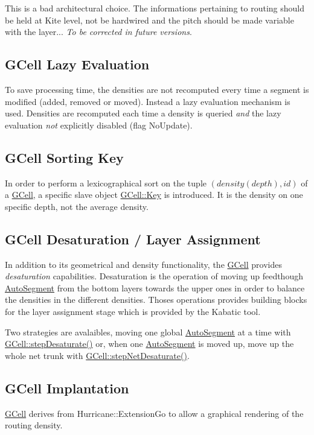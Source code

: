 This is a bad architectural choice. The informations pertaining to routing should be held at Kite level, not be hardwired and the pitch should be made variable with the layer... {\itshape To be corrected in future versions}.\hypertarget{classKatabatic_1_1GCell_secGCellLazyEvaluation}{}\subsection{G\+Cell Lazy Evaluation}\label{classKatabatic_1_1GCell_secGCellLazyEvaluation}
To save processing time, the densities are not recomputed every time a segment is modified (added, removed or moved). Instead a lazy evaluation mechanism is used. Densities are recomputed each time a density is queried {\itshape and} the lazy evaluation {\itshape not} explicitly disabled (flag No\+Update).\hypertarget{classKatabatic_1_1GCell_secGCellSortingKey}{}\subsection{G\+Cell Sorting Key}\label{classKatabatic_1_1GCell_secGCellSortingKey}
In order to perform a lexicographical sort on the tuple $(density(depth),id)$ of a \mbox{\hyperlink{classKatabatic_1_1GCell}{G\+Cell}}, a specific slave object \mbox{\hyperlink{classKatabatic_1_1GCell_1_1Key}{G\+Cell\+::\+Key}} is introduced. It is the density on one specific depth, not the average density.\hypertarget{classKatabatic_1_1GCell_secGCellDesaturation}{}\subsection{G\+Cell Desaturation / Layer Assignment}\label{classKatabatic_1_1GCell_secGCellDesaturation}
In addition to it\textquotesingle{}s geometrical and density functionality, the \mbox{\hyperlink{classKatabatic_1_1GCell}{G\+Cell}} provides {\itshape desaturation} capabilities. Desaturation is the operation of moving up feedthough \mbox{\hyperlink{classKatabatic_1_1AutoSegment}{Auto\+Segment}} from the bottom layers towards the upper ones in order to balance the densities in the different densities. Thoses operations provides building blocks for the layer assignment stage which is provided by the Kabatic tool.

Two strategies are avalaibles, moving one global \mbox{\hyperlink{classKatabatic_1_1AutoSegment}{Auto\+Segment}} at a time with \mbox{\hyperlink{classKatabatic_1_1GCell_a5ae4d250ebecf59aa98fb068d848be14}{G\+Cell\+::step\+Desaturate()}} or, when one \mbox{\hyperlink{classKatabatic_1_1AutoSegment}{Auto\+Segment}} is moved up, move up the whole net trunk with \mbox{\hyperlink{classKatabatic_1_1GCell_abe4cf4a81bb78e9b479992336a999a07}{G\+Cell\+::step\+Net\+Desaturate()}}.\hypertarget{classKatabatic_1_1GCell_secGCellImplantation}{}\subsection{G\+Cell Implantation}\label{classKatabatic_1_1GCell_secGCellImplantation}
\mbox{\hyperlink{classKatabatic_1_1GCell}{G\+Cell}} derives from Hurricane\+::\+Extension\+Go to allow a graphical rendering of the routing density. 

